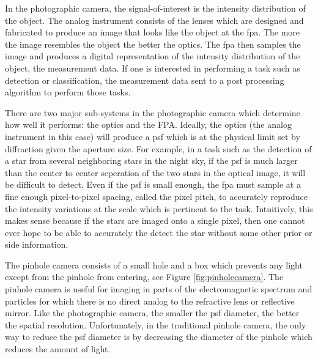 In the photographic camera, the signal-of-interest is the intensity distribution of the object. The analog instrument consists of the lenses which are designed and fabricated to produce an image that looks like the object at the \gls{fpa}. The more the image resembles the object the better the optics. The \gls{fpa} then samples the image and produces a digital representation of the intensity distribution of the object, the measurement data. If one is interested in performing a task such as detection or classification, the measurement data sent to a post processing algorithm to perform those tasks. 

There are two major sub-systems in the photographic camera which determine how well it performs: the optics and the FPA. Ideally, the optics (the analog instrument in this case) will produce a \gls{psf} which is at the physical limit set by diffraction given the aperture size. For example, in a task such as the detection of a star from several neighboring stars in the night sky, if the \gls{psf} is much larger than the center to center seperation of the two stars in the optical image, it will be difficult to detect. Even if the \gls{psf} is small enough, the \gls{fpa} must sample at a fine enough pixel-to-pixel spacing, called the \gls{pixel pitch}, to accurately reproduce the intensity variations at the scale which is pertinent to the task. Intuitively, this makes sense because if the stars are imaged onto a single pixel, then one cannot ever hope to be able to accurately the detect the star without some other prior or side information. 

The pinhole camera consists of a small hole and a box which prevents any light except from the pinhole from entering, see Figure \ref{fig:pinholecamera}. The pinhole camera is useful for imaging in parts of the electromagnetic spectrum and particles for which there is no direct analog to the refractive lens or reflective mirror. Like the photographic camera, the smaller the \gls{psf} diameter, the better the spatial resolution. Unfortunately, in the traditional pinhole camera, the only way to reduce the \gls{psf} diameter is by decreasing the diameter of the pinhole which reduces the amount of light.

